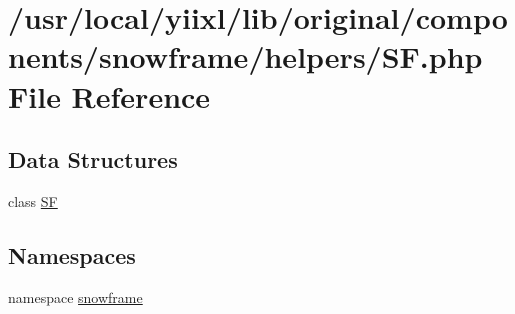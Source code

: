 \hypertarget{SF_8php}{
\section{/usr/local/yiixl/lib/original/components/snowframe/helpers/SF.php File Reference}
\label{SF_8php}
}
\subsection*{Data Structures}
\begin{DoxyCompactItemize}
\item 
class \hyperlink{classSF}{SF}
\end{DoxyCompactItemize}
\subsection*{Namespaces}
\begin{DoxyCompactItemize}
\item 
namespace \hyperlink{namespacesnowframe}{snowframe}
\end{DoxyCompactItemize}
